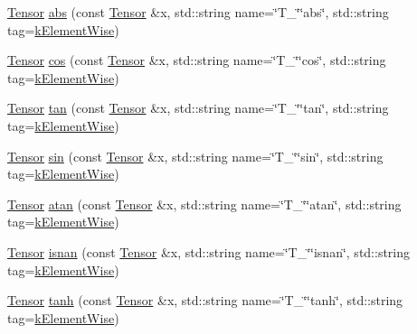 \begin{DoxyCompactItemize}
\item 
\hyperlink{classtvm_1_1te_1_1Tensor}{Tensor} \hyperlink{namespacetopi_a2784fda0b30c6fdf925e92e246b10508}{abs} (const \hyperlink{classtvm_1_1te_1_1Tensor}{Tensor} \&x, std\+::string name=\char`\"{}T\+\_\+\char`\"{}\char`\"{}abs\char`\"{}, std\+::string tag=\hyperlink{namespacetopi_ac1b34ed59d38a5f5338bee6b2cad42be}{k\+Element\+Wise})
\item 
\hyperlink{classtvm_1_1te_1_1Tensor}{Tensor} \hyperlink{namespacetopi_a90f0c42afb12c3d7f1256154cb8e0b7f}{cos} (const \hyperlink{classtvm_1_1te_1_1Tensor}{Tensor} \&x, std\+::string name=\char`\"{}T\+\_\+\char`\"{}\char`\"{}cos\char`\"{}, std\+::string tag=\hyperlink{namespacetopi_ac1b34ed59d38a5f5338bee6b2cad42be}{k\+Element\+Wise})
\item 
\hyperlink{classtvm_1_1te_1_1Tensor}{Tensor} \hyperlink{namespacetopi_a003324fc758b6f65294aeb7a9b7ada9b}{tan} (const \hyperlink{classtvm_1_1te_1_1Tensor}{Tensor} \&x, std\+::string name=\char`\"{}T\+\_\+\char`\"{}\char`\"{}tan\char`\"{}, std\+::string tag=\hyperlink{namespacetopi_ac1b34ed59d38a5f5338bee6b2cad42be}{k\+Element\+Wise})
\item 
\hyperlink{classtvm_1_1te_1_1Tensor}{Tensor} \hyperlink{namespacetopi_a10ca4bd733a98424cef7953bc9236dfb}{sin} (const \hyperlink{classtvm_1_1te_1_1Tensor}{Tensor} \&x, std\+::string name=\char`\"{}T\+\_\+\char`\"{}\char`\"{}sin\char`\"{}, std\+::string tag=\hyperlink{namespacetopi_ac1b34ed59d38a5f5338bee6b2cad42be}{k\+Element\+Wise})
\item 
\hyperlink{classtvm_1_1te_1_1Tensor}{Tensor} \hyperlink{namespacetopi_a0b3d467c4c95817d68fd2887ca0ecd8b}{atan} (const \hyperlink{classtvm_1_1te_1_1Tensor}{Tensor} \&x, std\+::string name=\char`\"{}T\+\_\+\char`\"{}\char`\"{}atan\char`\"{}, std\+::string tag=\hyperlink{namespacetopi_ac1b34ed59d38a5f5338bee6b2cad42be}{k\+Element\+Wise})
\item 
\hyperlink{classtvm_1_1te_1_1Tensor}{Tensor} \hyperlink{namespacetopi_a45876b65f453b816e8f136c749bb650b}{isnan} (const \hyperlink{classtvm_1_1te_1_1Tensor}{Tensor} \&x, std\+::string name=\char`\"{}T\+\_\+\char`\"{}\char`\"{}isnan\char`\"{}, std\+::string tag=\hyperlink{namespacetopi_ac1b34ed59d38a5f5338bee6b2cad42be}{k\+Element\+Wise})
\item 
\hyperlink{classtvm_1_1te_1_1Tensor}{Tensor} \hyperlink{namespacetopi_ab5cb2628d1686589c27254ce1767fa91}{tanh} (const \hyperlink{classtvm_1_1te_1_1Tensor}{Tensor} \&x, std\+::string name=\char`\"{}T\+\_\+\char`\"{}\char`\"{}tanh\char`\"{}, std\+::string tag=\hyperlink{namespacetopi_ac1b34ed59d38a5f5338bee6b2cad42be}{k\+Element\+Wise})

\end{DoxyCompactItemize}
